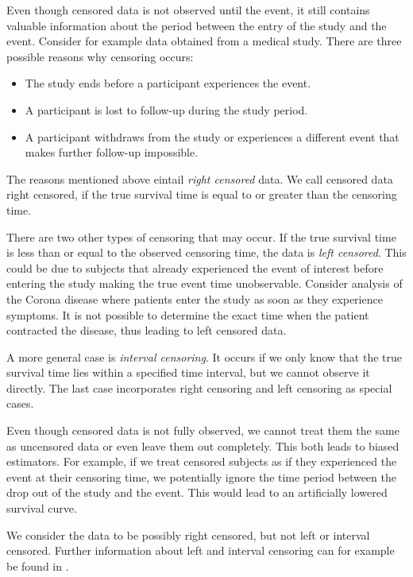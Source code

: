 \documentclass[12pt, a4paper]{scrartcl}
\theoremstyle{definition}
\theoremstyle{plain}
\numberwithin{equation}{section}
\numberwithin{figure}{section}
\numberwithin{table}{section}
\begin{document}
	Even though censored data is not observed until the event, it still contains valuable information about the period between the entry of the study and the event.
	Consider for example data obtained from a medical study.
	There are three possible reasons why censoring occurs:
	\begin{itemize}
		\item The study ends before a participant experiences the event.
		\item A participant is lost to follow-up during the study period. %
		\item A participant withdraws from the study or experiences a different event that makes further follow-up impossible.
	\end{itemize}
	The reasons mentioned above eintail \emph{right censored} data.
	We call censored data right censored, if the true survival time is equal to or greater than the censoring time.
	
	There are two other types of censoring that may occur.
	If the true survival time is less than or equal to the observed censoring time, the data is \emph{left censored}.
	This could be due to subjects that already experienced the event of interest before entering the study making the true event time unobservable.
	Consider analysis of the Corona disease where patients enter the study as soon as they experience symptoms.
	It is not possible to determine the exact time when the patient contracted the disease, thus leading to left censored data.
	
	A more general case is \emph{interval censoring}.
	It occurs if we only know that the true survival time lies within a specified time interval, but we cannot observe it directly.
	The last case incorporates right censoring and left censoring as special cases.
	
	Even though censored data is not fully observed, we cannot treat them the same as uncensored data or even leave them out completely.
	This both leads to biased estimators.
	For example, if we treat censored subjects as if they experienced the event at their censoring time, we potentially ignore the time period between the drop out of the study and the event.
	This would lead to an artificially lowered survival curve.
		
	We consider the data to be possibly right censored, but not left or interval censored.
	Further information about left and interval censoring can for example be found in \citet*{bookfailuretime}.
\end{document}
